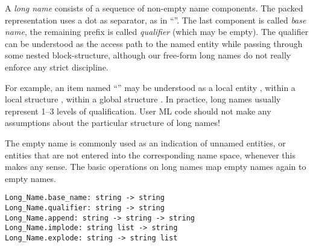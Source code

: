 \begin{isabellebody}
\begin{isamarkuptext}
\begin{description}
  \end{description}%
\end{isamarkuptext}%
\isamarkuptrue%
%
\endisatagmlref
{\isafoldmlref}%
%
\isadelimmlref
%
\endisadelimmlref
%
\isamarkuptrue%
%
\begin{isamarkuptext}%
A \emph{long name} consists of a sequence of non-empty name
  components.  The packed representation uses a dot as separator, as
  in ``''.  The last component is called \emph{base
  name}, the remaining prefix is called \emph{qualifier} (which may be
  empty).  The qualifier can be understood as the access path to the
  named entity while passing through some nested block-structure,
  although our free-form long names do not really enforce any strict
  discipline.

  For example, an item named ``'' may be understood as
  a local entity , within a local structure ,
  within a global structure .  In practice, long names
  usually represent 1--3 levels of qualification.  User ML code should
  not make any assumptions about the particular structure of long
  names!

  The empty name is commonly used as an indication of unnamed
  entities, or entities that are not entered into the corresponding
  name space, whenever this makes any sense.  The basic operations on
  long names map empty names again to empty names.%
\end{isamarkuptext}%
\isamarkuptrue%
%
\isadelimmlref
%
\endisadelimmlref
%
\isatagmlref
%
\begin{isamarkuptext}%
\begin{mldecls}
  \verb|Long_Name.base_name: string -> string| \\
  \verb|Long_Name.qualifier: string -> string| \\
  \verb|Long_Name.append: string -> string -> string| \\
  \verb|Long_Name.implode: string list -> string| \\
  \verb|Long_Name.explode: string -> string list| \\
  \end{mldecls}

  \begin{description}


\end{description}
\end{isamarkuptext}
\end{isabellebody}
